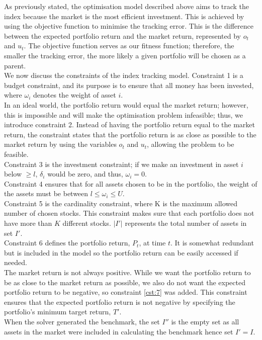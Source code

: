 \documentclass[12pt]{report}
\begin{document}
\noindent
As previously stated, the optimisation model described above aims to track the index because the market is the most efficient investment. This is achieved by using the objective function to minimise the tracking error. This is the difference between the expected portfolio return and the market return, represented by $o_t$ and $u_t$. The objective function serves as our fitness function; therefore, the smaller the tracking error, the more likely a given portfolio will be chosen as a parent.\\ \newline
\noindent
We now discuss the constraints of the index tracking model.
Constraint 1 is a budget constraint, and its purpose is to ensure that all money has been invested, where $\omega_i$ denotes the weight of asset $i$.\\ \newline
\noindent
In an ideal world, the portfolio return would equal the market return; however, this is impossible and will make the optimisation problem infeasible; thus, we introduce constraint 2. Instead of having the portfolio return equal to the market return, the constraint states that the portfolio return is as close as possible to the market return by using the variables $o_t$ and $u_t$, allowing the problem to be feasible.\\ \newline
\noindent
Constraint 3 is the investment constraint; if we make an investment in asset $i$ below $\geq l$, $\delta_i$ would be zero, and thus, $\omega_i = 0$. \\ \newline
\noindent
Constraint 4 ensures that for all assets chosen to be in the portfolio, the weight of the assets must be between $l \leq \omega_i \leq U$. \\ \newline
\noindent
Constraint 5 is the cardinality constraint, where K is the maximum allowed number of chosen stocks. This constraint makes sure that each portfolio does not have more than $K$ different stocks. $|I'|$ represents the total number of assets in set $I'$.\\ \newline
\noindent
Constraint 6 defines the portfolio return, $P_t$, at time $t$. It is somewhat redundant but is included in the model so the portfolio return can be easily accessed if needed. \\ \newline
\noindent
The market return is not always positive. While we want the portfolio return to be as close to the market return as possible, we also do not want the expected portfolio return to be negative, so constraint \ref{cst:7} was added. This constraint ensures that the expected portfolio return is not negative by specifying the portfolio's minimum target return, $T'$. \\ \newline \noindent
When the solver generated the benchmark, the set $I''$ is the empty set as all assets in the market were included in calculating the benchmark hence set $I'=I$.
\newpage
\end{document}
